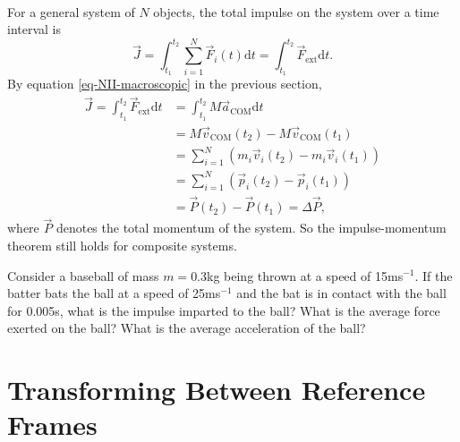 \documentclass[../classical_mechanics.tex]{subfiles}
\begin{document}
        \paragraph{}
        For a general system of $N$ objects, the total impulse on the system over a time interval is
        \begin{equation}
            \vec{J}=\int_{t_1}^{t_2}\sum_{i=1}^N\vec{F}_i(t)\mathrm{d}t=\int_{t_1}^{t_2}\vec{F}_\text{ext}\mathrm{d}t.
        \end{equation}
        By equation \ref{eq-NII-macroscopic} in the previous section,
        \begin{align}
            \vec{J}=\int_{t_1}^{t_2}\vec{F}_\text{ext}\mathrm{d}t&=\int_{t_1}^{t_2}M\vec{a}_\text{COM}\mathrm{d}t\\
            &=M\vec{v}_\text{COM}(t_2) - M\vec{v}_\text{COM}(t_1)\\
            &=\sum_{i=1}^N\left(m_i\vec{v}_i(t_2) - m_i\vec{v}_i(t_1)\right)\\
            &=\sum_{i=1}^N\left(\vec{p}_i(t_2) - \vec{p}_i(t_1)\right)\\
            &=\vec{P}(t_2) - \vec{P}(t_1)=\Delta\vec{P},
        \end{align}
        where $\vec{P}$ denotes the total momentum of the system.
        So the impulse-momentum theorem still holds for composite systems.
        \begin{example}
            Consider a baseball of mass $m=$0.3kg being thrown at a speed of 15ms$^{-1}$.
            If the batter bats the ball at a speed of 25ms$^{-1}$ and the bat is in contact with the ball for 0.005s, what is the impulse imparted to the ball?
            What is the average force exerted on the ball? What is the average acceleration of the ball?
        \end{example}

    \section{Transforming Between Reference Frames}
\end{document}
